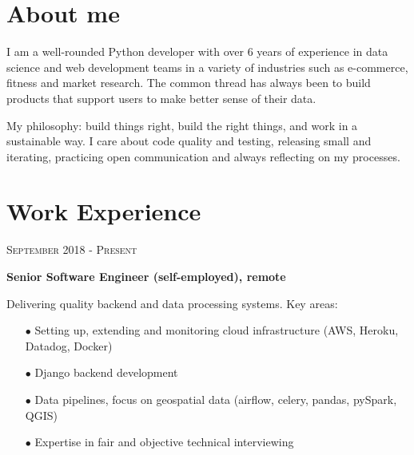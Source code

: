 \documentclass[9pt]{article} %
\begin{document}
\begin{minipage}[t]{0.5\textwidth} %
\vspace{0pt} %
	



\section{About me} 


\normalsize{I am a well-rounded Python developer with over 6 years of experience in data science and web development teams in a variety of industries such as e-commerce, fitness and market research. The common thread has always been to build products that support users to make better sense of their data.
    
My philosophy: build things right, build the right things, and work in a sustainable way. I care about code quality and testing, releasing small and iterating, practicing open communication and always reflecting on my processes.}
	



\section{Work Experience} 

{\raggedleft\textsc{September 2018 - Present}\par}

    {\raggedright\large \textbf{Senior Software Engineer (self-employed), remote}\\
}

\normalsize{Delivering quality backend and data processing systems. Key areas:}
\begin{itemize}
    \item[$\bullet$] Setting up, extending and monitoring cloud infrastructure (AWS, Heroku, Datadog, Docker)
\item[$\bullet$] Django backend development
\item[$\bullet$] Data pipelines, focus on geospatial data (airflow, celery, pandas, pySpark, QGIS)
\item[$\bullet$] Expertise in fair and objective technical interviewing
\end{itemize}


\end{minipage}
\end{document}
